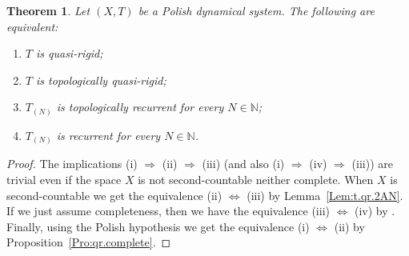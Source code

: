 \documentclass[openright,11pt]{article}
\theoremstyle{plain}
\newtheorem{theorem}{Theorem}[section]
\theoremstyle{definition}
\newcommand{\NN}{\mathbb{N}}
\begin{document}
\begin{theorem}\label{The:Juan}
	Let $(X,T)$ be a Polish dynamical system. The following are equivalent:
	\begin{enumerate}[{\em(i)}]
		\item $T$ is quasi-rigid;
		
		\item $T$ is topologically quasi-rigid;
		
		\item $T_{(N)}$ is topologically recurrent for every $N \in \NN$;
		
		\item $T_{(N)}$ is recurrent for every $N \in \NN$.
	\end{enumerate}
\end{theorem}
\begin{proof} 
	The implications (i) $\Rightarrow$ (ii) $\Rightarrow$ (iii) (and also (i) $\Rightarrow$ (iv) $\Rightarrow$ (iii)) are trivial even if the space $X$ is not second-countable neither complete. When $X$ is second-countable we get the equivalence (ii) $\Leftrightarrow$ (iii) by Lemma~\ref{Lem:t.qr.2AN}. If we just assume completeness, then we have the equivalence (iii) $\Leftrightarrow$ (iv) by \cite[Proposition 2.1]{CoMaPa2014}. Finally, using the Polish hypothesis we get the equivalence (i) $\Leftrightarrow$ (ii) by Proposition~\ref{Pro:qr.complete}.
\end{proof}
\end{document}

